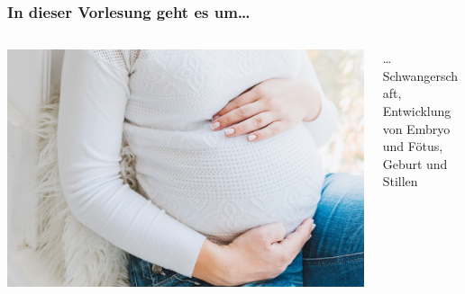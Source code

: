 \documentclass{beamer}
\begin{document}
 
\begin{frame}
\frametitle{In dieser Vorlesung geht es um\dots}


\begin{columns}[c]
\begin{column}{5cm}
\includegraphics[width=\textwidth]{schwangerer_bauch.jpg}

\end{column}

\begin{column}{6cm}

\dots Schwangerschaft, \\ 
Entwicklung von Embryo und Fötus, \\
Geburt und Stillen

\end{column}
\end{columns}






\end{frame} 


 
\end{document}
